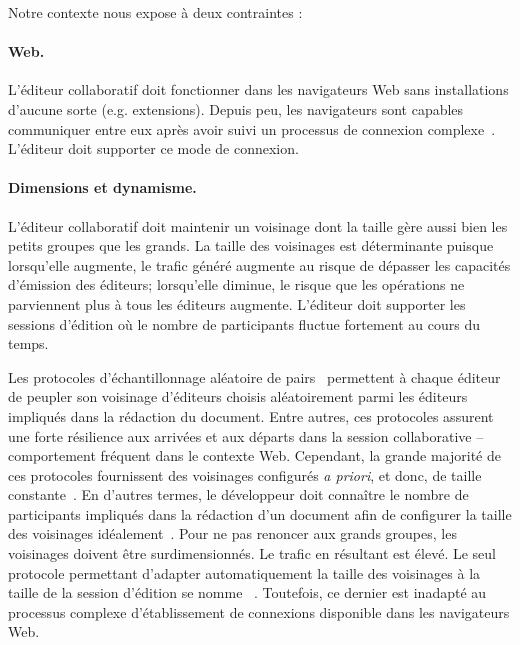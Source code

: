 \noindent Notre contexte nous expose à deux contraintes :

\paragraph{Web.} L'éditeur collaboratif doit fonctionner dans les navigateurs
Web sans installations d'aucune sorte (e.g. extensions). Depuis peu, les
navigateurs sont capables communiquer entre eux après avoir suivi un processus
de connexion complexe~\cite{webrtc}. L'éditeur doit supporter ce mode de
connexion.

\paragraph{Dimensions et dynamisme.} L'éditeur collaboratif doit maintenir un
voisinage dont la taille gère aussi bien les petits groupes que les grands.  La
taille des voisinages est déterminante puisque lorsqu'elle augmente, le trafic
généré augmente au risque de dépasser les capacités d'émission des éditeurs;
lorsqu'elle diminue,
le risque que les opérations ne parviennent plus à tous les éditeurs augmente.
L'éditeur doit supporter les sessions d'édition où le nombre de participants
fluctue fortement au cours du temps.

Les protocoles d'échantillonnage aléatoire de pairs~\cite{jelasity2007gossip}
permettent à chaque éditeur de peupler son voisinage d'éditeurs choisis
aléatoirement parmi les éditeurs impliqués dans la rédaction du document. Entre
autres, ces protocoles assurent une forte résilience aux arrivées et aux départs
dans la session collaborative -- comportement fréquent dans le contexte
Web. Cependant, la grande majorité de ces protocoles fournissent des voisinages
configurés \emph{a priori}, et donc, de taille
constante~\cite{eugster2003lightweight, jelasity2007gossip,
  leitao2007dependable, tolgyeski2009adaptive, voulgaris2005cyclon}. En d'autres
termes, le développeur doit connaître le nombre de participants impliqués dans
la rédaction d'un document afin de configurer la taille des voisinages
idéalement~\cite{erdos1959random}.  Pour ne pas renoncer aux grands groupes, les
voisinages doivent être surdimensionnés. Le trafic en résultant est élevé. Le
seul protocole permettant d'adapter automatiquement la taille des voisinages à
la taille de la session d'édition se nomme
\SCAMP~\cite{ganesh2003peer}. Toutefois, ce dernier est inadapté au processus
complexe d'établissement de connexions disponible dans les navigateurs Web.

